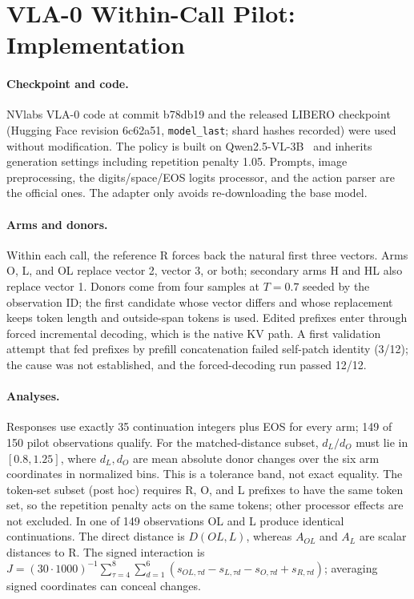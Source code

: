 \section{VLA-0 Within-Call Pilot: Implementation}
\label{sec:vla0impl}
\paragraph{Checkpoint and code.} NVlabs VLA-0 code at commit b78db19 and the released LIBERO checkpoint (Hugging Face revision 6c62a51, \texttt{model\_last}; shard hashes recorded) were used without modification. The policy is built on Qwen2.5-VL-3B~\cite{bai2025qwen25vl} and inherits generation settings including repetition penalty 1.05. Prompts, image preprocessing, the digits/space/EOS logits processor, and the action parser are the official ones. The adapter only avoids re-downloading the base model.

\paragraph{Arms and donors.} Within each call, the reference R forces back the natural first three vectors. Arms O, L, and OL replace vector 2, vector 3, or both; secondary arms H and HL also replace vector 1. Donors come from four samples at $T=0.7$ seeded by the observation ID; the first candidate whose vector differs and whose replacement keeps token length and outside-span tokens is used. Edited prefixes enter through forced incremental decoding, which is the native KV path. A first validation attempt that fed prefixes by prefill concatenation failed self-patch identity (3/12); the cause was not established, and the forced-decoding run passed 12/12.

\paragraph{Analyses.} Responses use exactly 35 continuation integers plus EOS for every arm; 149 of 150 pilot observations qualify. For the matched-distance subset, $d_L/d_O$ must lie in $[0.8,1.25]$, where $d_L,d_O$ are mean absolute donor changes over the six arm coordinates in normalized bins. This is a tolerance band, not exact equality. The token-set subset (post hoc) requires R, O, and L prefixes to have the same token set, so the repetition penalty acts on the same tokens; other processor effects are not excluded. In one of 149 observations OL and L produce identical continuations. The direct distance is $D(OL,L)$, whereas $A_{OL}$ and $A_L$ are scalar distances to R. The signed interaction is $J=(30\cdot1000)^{-1}\sum_{\tau=4}^{8}\sum_{d=1}^{6}(s_{OL,\tau d}-s_{L,\tau d}-s_{O,\tau d}+s_{R,\tau d})$; averaging signed coordinates can conceal changes.

